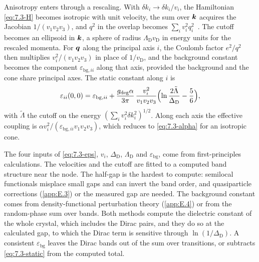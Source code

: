 Anisotropy enters through a rescaling. With $\delta k_i \to \delta k_i/v_i$, the Hamiltonian \cref{eq:7.3-H} becomes isotropic with unit velocity, the sum over $\bm{k}$ acquires the Jacobian $1/(v_1v_2v_3)$, and $q^2$ in the overlap becomes $\sum_iv_i^2q_i^2$~\cite[Eq.~(B.1)]{hochberg2018detection}. The cutoff becomes an ellipsoid in $\bm{k}$, a sphere of radius $\Lambda_{\mathrm{D}}v_{\mathrm{D}}$ in energy units for the rescaled momenta. For $\bm{q}$ along the principal axis $i$, the Coulomb factor $e^2/q^2$ then multiplies $v_i^2/(v_1v_2v_3)$ in place of $1/v_{\mathrm{D}}$, and the background constant becomes the component $\varepsilon_{\mathrm{bg},ii}$ along that axis, provided the background and the cone share principal axes. The static constant along $i$ is
\begin{equation}
  \varepsilon_{ii}(0,0) = \varepsilon_{\mathrm{bg},ii} + \frac{g_{\mathrm{deg}}\alpha}{3\pi}\,\frac{v_i^2}{v_1v_2v_3}\Bigl(\ln\frac{2\tilde\Lambda}{\Delta_{\mathrm{D}}} - \frac56\Bigr) ,
  \label{eq:7.3-aniso}
\end{equation}
with $\tilde\Lambda$ the cutoff on the energy $(\sum_iv_i^2\delta k_i^2)^{1/2}$. Along each axis the effective coupling is $\alpha v_i^2/(\varepsilon_{\mathrm{bg},ii}v_1v_2v_3)$, which reduces to \cref{eq:7.3-alpha} for an isotropic cone.

The four inputs of \cref{eq:7.3-eps}, $v_i$, $\Delta_{\mathrm{D}}$, $\Lambda_{\mathrm{D}}$ and $\varepsilon_{\mathrm{bg}}$, come from first-principles calculations. The velocities and the cutoff are fitted to a computed band structure near the node. The half-gap is the hardest to compute: semilocal functionals misplace small gaps and can invert the band order, and quasiparticle corrections (\cref{app:E.3}) or the measured gap are needed. The background constant comes from density-functional perturbation theory (\cref{app:E.4}) or from the random-phase sum over bands. Both methods compute the dielectric constant of the whole crystal, which includes the Dirac pairs, and they do so at the calculated gap, to which the Dirac term is sensitive through $\ln(1/\Delta_{\mathrm{D}})$. A consistent $\varepsilon_{\mathrm{bg}}$ leaves the Dirac bands out of the sum over transitions, or subtracts \cref{eq:7.3-static} from the computed total.

